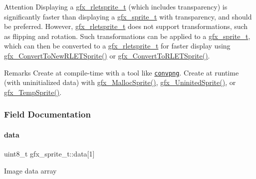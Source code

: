 \begin{DoxyAttention}{Attention}
Displaying a \hyperlink{structgfx__rletsprite__t}{gfx\+\_\+rletsprite\+\_\+t} (which includes transparency) is significantly faster than displaying a \hyperlink{structgfx__sprite__t}{gfx\+\_\+sprite\+\_\+t} with transparency, and should be preferred. However, \hyperlink{structgfx__rletsprite__t}{gfx\+\_\+rletsprite\+\_\+t} does not support transformations, such as flipping and rotation. Such transformations can be applied to a \hyperlink{structgfx__sprite__t}{gfx\+\_\+sprite\+\_\+t}, which can then be converted to a \hyperlink{structgfx__rletsprite__t}{gfx\+\_\+rletsprite\+\_\+t} for faster display using \hyperlink{graphx_8h_ae7f27ad7ae83cab2f30582c2df711caa}{gfx\+\_\+\+Convert\+To\+New\+R\+L\+E\+T\+Sprite()} or \hyperlink{graphx_8h_a0c44bd4f12f482fa7343e9fd7edc1237}{gfx\+\_\+\+Convert\+To\+R\+L\+E\+T\+Sprite()}.
\end{DoxyAttention}
\begin{DoxyRemark}{Remarks}
Create at compile-\/time with a tool like \href{https://github.com/MattWaltz/convpng}{\tt convpng}. Create at runtime (with uninitialized data) with \hyperlink{graphx_8h_add09e11cb2d5b761ea1b336c07d9283e}{gfx\+\_\+\+Malloc\+Sprite()}, \hyperlink{graphx_8h_aec1bf1b311dee9f387931b37db5ec5f0}{gfx\+\_\+\+Uninited\+Sprite()}, or \hyperlink{graphx_8h_ad95d6ddd408bb6c0fad041353da0d7ea}{gfx\+\_\+\+Temp\+Sprite()}. 
\end{DoxyRemark}


\subsubsection{Field Documentation}
\mbox{\label{structgfx__sprite__t_afbaeef67c679b34129dd80814c77705a}} 
\paragraph{\texorpdfstring{data}{data}}
{\footnotesize\ttfamily uint8\+\_\+t gfx\+\_\+sprite\+\_\+t\+::data\mbox{[}1\mbox{]}}

Image data array \mbox{\label{structgfx__sprite__t_a25b687d1d45d86e9ae29318f8f135cf4}} 
